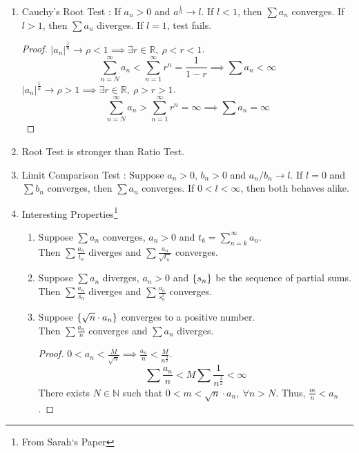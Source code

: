 \begin{enumerate}
		\subitem If $l = 1$, test fails.
	\begin{proof}
		$|a_{N+1}| < |a_N|l$, $|a_{N+2}| < |a_N|l^2$ \dots $|a_{N+k}| < |a_N|l^k$.
		$$\sum_{n = N}^\infty a_n < a_N \sum_{n=0}^\infty l^n = \frac{a_N}{1-l} \implies \sum a_n < \infty$$
	\end{proof}
	\item Cauchy's Root Test : If $a_n > 0$ and $a^\frac{1}{n} \to l$.
		\subitem If $l < 1$, then $\sum a_n$ converges.
		\subitem If $l > 1$, then $\sum a_n$ diverges.
		\subitem If $l = 1$, test fails.
	\begin{proof}
		$|a_n|^\frac{1}{n} \to \rho < 1 \implies \exists r \in \mathbb{R},\ \rho < r < 1$.
		$$ \sum_{n = N}^\infty  a_n < \sum_{n=1}^\infty r^n = \frac{1}{1-r} \implies \sum a_n < \infty$$
		$|a_n|^\frac{1}{n} \to \rho > 1 \implies \exists r \in \mathbb{R},\ \rho > r > 1$.
		$$ \sum_{n = N}^\infty a_n > \sum_{n=1}^\infty r^n = \infty \implies \sum a_n = \infty $$
	\end{proof}
	\item Root Test is stronger than Ratio Test.
	\item { \color{red}Limit Comparison Test : Suppose $a_n > 0$, $b_n > 0$ and $a_n/b_n \to l$.
		\subitem If $l = 0$ and $\sum b_n$ converges, then $\sum a_n$ converges.
		\subitem If $0 < l < \infty$, then both behaves alike.}
	\item Interesting Properties\footnote{From Sarah`s Paper}
	\begin{enumerate}
		\item Suppose $\sum a_n$ converges, $a_n > 0$ and $t_k = \sum_{n = k}^\infty a_n$.\\ Then $\sum \frac{a_n}{t_n}$ diverges and $\sum \frac{a_n}{\sqrt{t_n}}$ converges.%
		\item Suppose $\sum a_n$ diverges, $a_n > 0$ and $\{s_n\}$ be the sequence of partial sums.\\ Then $\sum \frac{a_n}{s_n}$ diverges and $\sum \frac{a_n}{s_n^2}$ converges. %
		\item Suppose $\{\sqrt{n} \cdot a_n\}$ converges to a positive number.\\ Then $\sum \frac{a_n}{n}$ converges and $\sum a_n$ diverges. %
		\begin{proof}
			$0 < a_n < \frac{M}{\sqrt{n}} \implies \frac{a_n}{n} < \frac{M}{n^\frac{3}{2}}$.
			$$ \sum \frac{a_n}{n} < M \sum \frac{1}{n^\frac{3}{2}} < \infty $$
			There exists $N \in \mathbb{N}$ such that $0 < m < \sqrt{n} \cdot a_n,\ \forall n > N$. Thus, $\frac{m}{n} < a_n$.

\end{proof}
\end{enumerate}
\end{enumerate}
